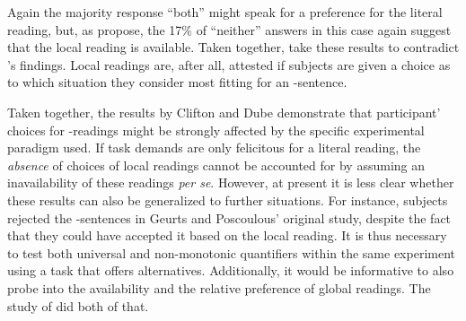 \documentclass[fleqn,reqno,10pt,draft]{article}
\newcommand{\as}{\acro{as}}
\renewcommand{\es}{\acro{es}}
\begin{document}
\noindent Again the majority response ``both'' might speak for a
preference for the literal reading, but, as
\citeauthor{CliftonDube2010:Embedded-Implic} propose, the 17\% of
``neither'' answers in this case again suggest that the local reading
is available. Taken together,
\citeauthor{CliftonDube2010:Embedded-Implic} take these results to
contradict \citeauthor{GeurtsPouscoulous2009:Embedded-Implic}'s
findings. Local readings are, after all, attested if subjects are
given a choice as to which situation they consider most fitting for an
\as-sentence.

Taken together, the results by Clifton and Dube demonstrate that
participant' choices for \as-readings might be strongly affected by
the specific experimental paradigm used. If task demands are only
felicitous for a literal reading, the \emph{absence} of choices of
local readings cannot be accounted for by assuming an inavailability
of these readings \emph{per se}. However, at present it is less clear whether these results
can also be generalized to further situations. For instance, subjects
rejected the \es-sentences in Geurts and Poscoulous' original study,
despite the fact that they could have accepted it based on the local
reading. It is thus necessary to test both universal and non-monotonic
quantifiers within the same experiment using a task that offers
alternatives. Additionally, it would be informative to also probe into
the availability and the relative preference of global readings. The
study of \citet{ChemlaSpector2010:Experimental-Ev} did both of that.

\subsection{\citet{ChemlaSpector2010:Experimental-Ev}}
\label{sec:Chemla-Spector}
\end{document}
